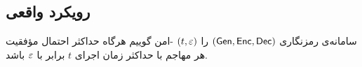 \subsection*{رویکرد واقعی}
\begin{definition}
	\cite{katz2014introduction}
	سامانه‌ی رمز‌نگاری 
	$(\mathsf{Gen}, \mathsf{Enc}, \mathsf{Dec})$
	را 
	$(t, \varepsilon)$
	-امن گوییم هرگاه حداکثر احتمال مؤفقیت هر مهاجم با حداکثر زمان اجرای 
	$t$
	برابر با 
	$\varepsilon$
	باشد. 
\end{definition}
%

